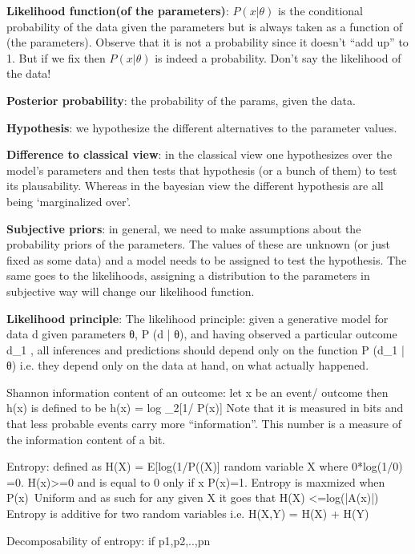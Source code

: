 \textbf{Likelihood function(of the parameters)}: $P(x|\theta)$ is the conditional probability of the data given the parameters but is always taken as a function of \theta (the parameters). Observe that it is not a probability since it doesn't “add up” to 1. But if we fix \theta then $P(x|\theta)$ is indeed a probability. 
Don’t say the likelihood of the data!

\textbf{Posterior probability}: the probability of the params, given the data.

\textbf{Hypothesis}: we hypothesize the different alternatives to the parameter values. 

\textbf{Difference to classical view}: in the classical view one hypothesizes over the model’s parameters and then tests that hypothesis (or a bunch of them) to test its plausability. Whereas in the bayesian view the different hypothesis are all being ‘marginalized over’.

\textbf{Subjective priors}: in general, we need to make assumptions about the probability priors of the parameters. The values of these are unknown (or just fixed as some data) and a model needs to be assigned to test the hypothesis. The same goes to the likelihoods, assigning a distribution to the parameters in subjective way will change our likelihood function.

\textbf{Likelihood principle}: The likelihood principle: given a generative model for data d given parameters θ, P (d | θ), and having observed a particular outcome d_1 , all inferences and predictions should depend only on the function P (d_1 | θ) i.e. they depend only on the data at hand, on what actually happened. 

Shannon information content of an outcome: let x be an event/ outcome then h(x) is defined to be h(x) = log _2[1/ P(x)]
Note that it is measured in bits and that less probable events carry more “information”.
This number is a measure of the information content of a bit. 

Entropy: defined as H(X) =  E[log(1/P((X)] random variable X where 0*log(1/0) =0. H(x)>=0 and is equal to 0 only if x P(x)=1. 
Entropy is maxmized when P(x)~Uniform and as such for any given X it goes that H(X) <=log(|A(x)|)
Entropy is additive for two random variables i.e. H(X,Y) = H(X) + H(Y)

Decomposability of entropy:  if {p1,p2,..,pn}


